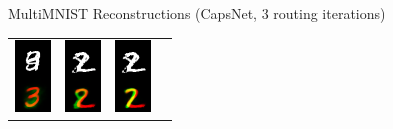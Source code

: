 \documentclass{beamer}
\begin{document}
{\begin{frame}{MultiMNIST Reconstructions (CapsNet, 3 routing iterations)}
\begin{center}
\begin{tabular}{c c c c}
          \includegraphics[height=.3\textheight]{../img/recons/4_3_3_4_397} &
          \includegraphics[height=.3\textheight]{../img/recons/2_8_2_7_152} &
          \includegraphics[height=.3\textheight]{../img/recons/2_8_2_7_153p}
        \end{tabular}
      \end{center}
    \end{frame}

}
\end{document}
